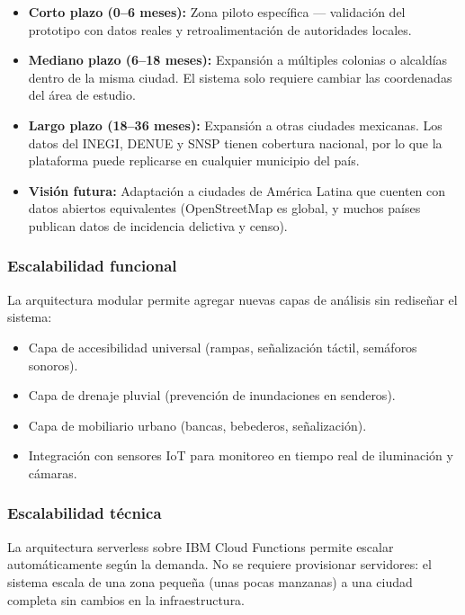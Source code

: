 \documentclass[12pt,a4paper]{article}
\begin{document}
\begin{itemize}[leftmargin=1.5cm]
    \item \textbf{Corto plazo (0--6 meses):} Zona piloto específica — validación del prototipo con datos reales y retroalimentación de autoridades locales.
    \item \textbf{Mediano plazo (6--18 meses):} Expansión a múltiples colonias o alcaldías dentro de la misma ciudad. El sistema solo requiere cambiar las coordenadas del área de estudio.
    \item \textbf{Largo plazo (18--36 meses):} Expansión a otras ciudades mexicanas. Los datos del INEGI, DENUE y SNSP tienen cobertura nacional, por lo que la plataforma puede replicarse en cualquier municipio del país.
    \item \textbf{Visión futura:} Adaptación a ciudades de América Latina que cuenten con datos abiertos equivalentes (OpenStreetMap es global, y muchos países publican datos de incidencia delictiva y censo).
\end{itemize}

\subsubsection{Escalabilidad funcional}

La arquitectura modular permite agregar nuevas capas de análisis sin rediseñar el sistema:

\begin{itemize}[leftmargin=1.5cm]
    \item Capa de accesibilidad universal (rampas, señalización táctil, semáforos sonoros).
    \item Capa de drenaje pluvial (prevención de inundaciones en senderos).
    \item Capa de mobiliario urbano (bancas, bebederos, señalización).
    \item Integración con sensores IoT para monitoreo en tiempo real de iluminación y cámaras.
\end{itemize}

\subsubsection{Escalabilidad técnica}

La arquitectura serverless sobre IBM Cloud Functions permite escalar automáticamente según la demanda. No se requiere provisionar servidores: el sistema escala de una zona pequeña (unas pocas manzanas) a una ciudad completa sin cambios en la infraestructura.
\end{document}
